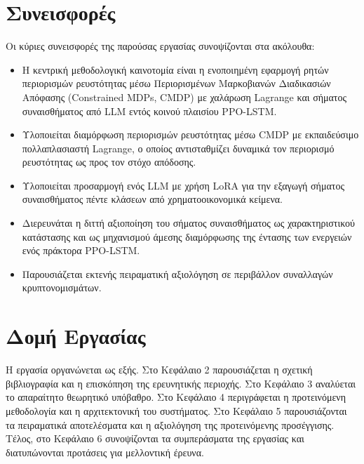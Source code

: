 \section{Συνεισφορές}
Οι κύριες συνεισφορές της παρούσας εργασίας συνοψίζονται στα ακόλουθα:
\begin{itemize}
    \item Η κεντρική μεθοδολογική καινοτομία είναι η ενοποιημένη εφαρμογή
    ρητών περιορισμών ρευστότητας μέσω Περιορισμένων Μαρκοβιανών Διαδικασιών
    Απόφασης (Constrained MDPs, CMDP) με χαλάρωση Lagrange και σήματος
    συναισθήματος από LLM εντός κοινού πλαισίου PPO-LSTM.
    \item Υλοποιείται διαμόρφωση περιορισμών ρευστότητας μέσω CMDP με
    εκπαιδεύσιμο πολλαπλασιαστή Lagrange, ο οποίος αντισταθμίζει δυναμικά
    τον περιορισμό ρευστότητας ως προς τον στόχο απόδοσης.
    \item Υλοποιείται προσαρμογή ενός LLM με χρήση LoRA για την εξαγωγή
    σήματος συναισθήματος πέντε κλάσεων από χρηματοοικονομικά κείμενα.
    \item Διερευνάται η διττή αξιοποίηση του σήματος συναισθήματος ως
    χαρακτηριστικού κατάστασης και ως μηχανισμού άμεσης διαμόρφωσης
    της έντασης των ενεργειών ενός πράκτορα PPO-LSTM.
    \item Παρουσιάζεται εκτενής πειραματική αξιολόγηση σε περιβάλλον
    συναλλαγών κρυπτονομισμάτων.
\end{itemize}

\section{Δομή Εργασίας}
Η εργασία οργανώνεται ως εξής. Στο Κεφάλαιο 2 παρουσιάζεται η σχετική βιβλιογραφία 
και η επισκόπηση της ερευνητικής περιοχής. Στο Κεφάλαιο 3 αναλύεται το απαραίτητο θεωρητικό υπόβαθρο. 
Στο Κεφάλαιο 4 περιγράφεται η προτεινόμενη μεθοδολογία και η αρχιτεκτονική του συστήματος. 
Στο Κεφάλαιο 5 παρουσιάζονται τα πειραματικά αποτελέσματα και η αξιολόγηση της προτεινόμενης προσέγγισης. 
Τέλος, στο Κεφάλαιο 6 συνοψίζονται τα συμπεράσματα της εργασίας και διατυπώνονται προτάσεις για μελλοντική έρευνα.
